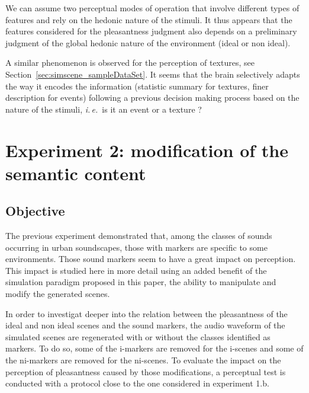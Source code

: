 \documentclass[12pt]{elsarticle}
\newcommand{\ie}{\emph{i.\,e.}}
\begin{document}
We can assume two perceptual modes of operation that involve different types of features and rely on the hedonic nature  of the stimuli. It thus appears that the features considered for the pleasantness judgment also depends on a preliminary judgment of the global hedonic nature of the environment (ideal or non ideal).

A similar phenomenon is observed for the perception of textures, see Section~\ref{sec:simscene_sampleDataSet}. It seems that the brain selectively adapts the way it encodes the information (statistic summary for textures, finer description for events) following a previous decision making process based on the nature of the stimuli, \ie~is it an event or a texture ?

\section{Experiment 2: modification of the semantic content}
\label{sec:modification}

\subsection{Objective}


The previous experiment demonstrated that, among the classes of sounds occurring in urban soundscapes, those with markers are specific to some environments. Those sound markers seem to have a great impact on perception. This impact is studied here in more detail using an added benefit of the simulation paradigm proposed in this paper, the ability to manipulate and modify the generated scenes.


In order to investigat deeper into the relation between the pleasantness of the ideal and non ideal scenes and the sound markers, the audio waveform of the simulated scenes are regenerated with or without the classes identified as markers. To do so, some of the i-markers are removed for the i-scenes and some of the ni-markers are removed for the ni-scenes. To evaluate the impact on the perception of pleasantness caused by those modifications, a perceptual test is conducted with a protocol close to the one considered in experiment 1.b.
\end{document}
